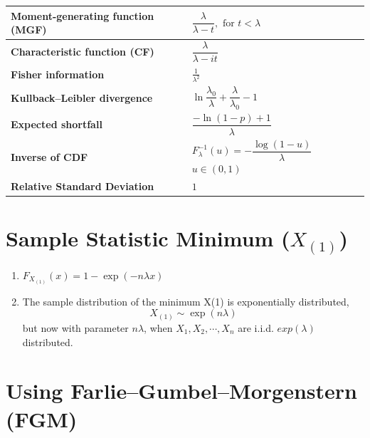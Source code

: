 \begin{customTableWrapper}{2}
\begin{longtable}{|m{6cm}|p{9cm}|}
    \textbf{Moment-generating function (MGF)} &
    ${\displaystyle {\dfrac {\lambda }{\lambda -t}},{\text{ for }}t<\lambda }$
    \\[1ex] \hline

    \textbf{Characteristic function (CF)} &
    ${\displaystyle {\dfrac {\lambda }{\lambda -it}}}$
    \\[1ex] \hline

    \textbf{Fisher information} &
    ${\displaystyle {\frac {1}{\lambda ^{2}}}}$
    \\[1ex] \hline

    \textbf{Kullback–Leibler divergence} &
    ${\displaystyle \ln {\dfrac {\lambda _{0}}{\lambda }}+{\dfrac {\lambda }{\lambda _{0}}}-1}$
    \\[1ex] \hline

    \textbf{Expected shortfall} &
    ${\displaystyle {\dfrac {-\ln(1-p)+1}{\lambda }}}$
    \\[1ex] \hline

    \textbf{Inverse of CDF \cite{ism-1}} &
    $F_\lambda^{-1}(u) = -\dfrac{\log(1-u)}{\lambda}$ $u \in (0,1)$
    \\[1ex] \hline

    \textbf{Relative Standard Deviation} &
    $1$
    \\[1ex] \hline

\end{longtable}
\end{customTableWrapper}


\section{Sample Statistic Minimum ($X_{(1)}$) \cite{ism-1}} \label{Exponential Distribution: Sample Statistic Minimum}

\begin{enumerate}
    \item $F_{X_{(1)}}(x) = 1 - \exp(-n\lambda x)$

    \item The sample distribution of the minimum X(1) is exponentially distributed, 
    \[
        X_{(1)} \sim \exp(n\lambda)
    \]
    but now with parameter $n\lambda$, when $X_1,X_2,\cdots, X_n$ are i.i.d. $exp(\lambda)$ distributed.
    
\end{enumerate}


\section{Using Farlie–Gumbel–Morgenstern (FGM) \cite{ism-1}} \label{Sample Statistic Minimum: Using Farlie–Gumbel–Morgenstern (FGM)}

